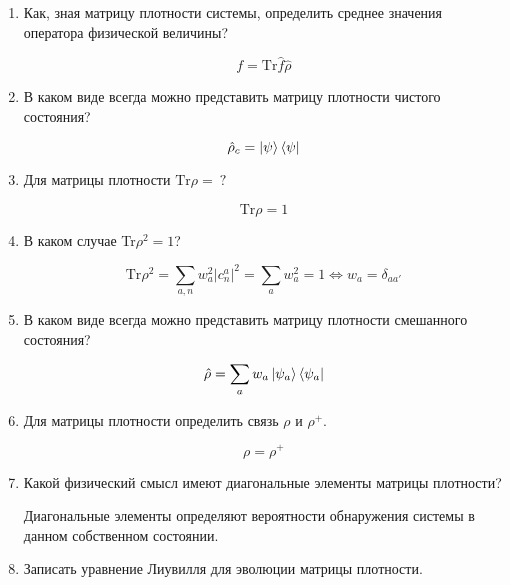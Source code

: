 \documentclass{article}
\begin{document}
\begin{enumerate}
	\item {Как, зная матрицу плотности системы, определить среднее значения оператора физической величины?}

	\begin{equation}
		f = \text{Tr} \hat{f}\hat{\rho}
	\end{equation}
	
	\item {В каком виде всегда можно представить матрицу плотности чистого состояния?}

	\begin{equation}
		\hat{\rho}_c = \ket{\psi}\bra{\psi}
	\end{equation}
	
	\item {Для матрицы плотности $\text{Tr} \rho = \ ?$}
	
	\begin{equation}
		\text{Tr}\rho = 1
	\end{equation}
	
	\item {В каком случае Tr$\rho^2 = 1$?}
	
	\begin{equation}
		\text{Tr} \rho^2 = \sum\limits_{a,n}w^2_a |c_n^a|^2 = \sum\limits_{a} w^2_a = 1 \iff w_a = \delta_{aa'}
	\end{equation}
	
	\item {В каком виде всегда можно представить матрицу плотности смешанного состояния?}
	
	\begin{equation}
		\hat{\rho} = \sum\limits_{a} w_a \ket{\psi_a}\bra{\psi_a}
	\end{equation}
	
	\item {Для матрицы плотности определить связь $\rho$ и $\rho^+$.}
	
	\begin{equation}
		\rho = \rho^+
	\end{equation}
	
	\item {Какой физический смысл имеют диагональные элементы матрицы плотности?}
	
	Диагональные элементы определяют вероятности обнаружения системы в данном собственном состоянии.
	
	\item {Записать уравнение Лиувилля для эволюции матрицы плотности.}
	

\end{enumerate}
\end{document}
